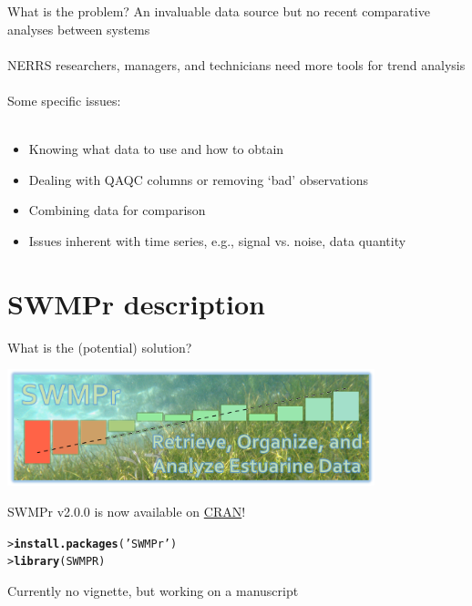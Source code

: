 \documentclass[serif]{beamer}\usepackage[]{graphicx}\usepackage[]{color}
\makeatletter
\newcommand{\hlstr}[1]{\textcolor[rgb]{0.192,0.494,0.8}{#1}}%
\newcommand{\hlstd}[1]{\textcolor[rgb]{0.345,0.345,0.345}{#1}}%
\newcommand{\hlkwd}[1]{\textcolor[rgb]{0.737,0.353,0.396}{\textbf{#1}}}%
\newenvironment{kframe}{%
 \def\at@end@of@kframe{}%
 \ifinner\ifhmode%
  \def\at@end@of@kframe{\end{minipage}}%
  \begin{minipage}{\columnwidth}%
 \fi\fi%
 \def\FrameCommand##1{\hskip\@totalleftmargin \hskip-\fboxsep
 \colorbox{shadecolor}{##1}\hskip-\fboxsep
     \hskip-\linewidth \hskip-\@totalleftmargin \hskip\columnwidth}%
 \MakeFramed {\advance\hsize-\width
   \@totalleftmargin\z@ \linewidth\hsize
   \@setminipage}}%
 {\par\unskip\endMakeFramed%
 \at@end@of@kframe}
\newenvironment{knitrout}{}{} %
\makeatother
\begin{document}
\begin{frame}{What is the problem?}
An invaluable data source but no recent comparative analyses between systems \\~\\
NERRS researchers, managers, and technicians need more tools for trend analysis \\~\\
Some specific issues:\\~\\
\begin{itemize}
\item Knowing what data to use and how to obtain
\item Dealing with QAQC columns or removing `bad' observations
\item Combining data for comparison
\item Issues inherent with time series, e.g., signal vs. noise, data quantity
\end{itemize}
\end{frame}

\section{SWMPr description}

\begin{frame}[fragile]{What is the (potential) solution?}
\centerline{\includegraphics[width = 0.8\textwidth]{fig/swmpr_logo.png}}
\vspace{0.15in}
SWMPr v2.0.0 is now available on \href{http://cran.r-project.org/web/packages/SWMPr/index.html}{CRAN}!
\begin{knitrout}
\color{fgcolor}\begin{kframe}
\begin{alltt}
\hlstd{> }\hlkwd{install.packages}\hlstd{(}\hlstr{'SWMPr'}\hlstd{)}
\hlstd{> }\hlkwd{library}\hlstd{(SWMPR)}
\end{alltt}
\end{kframe}
\end{knitrout}
Currently no vignette, but working on a manuscript
\end{frame}
\end{document}
